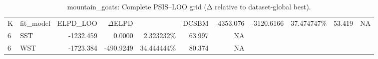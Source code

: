 \begin{table}[!h]
\centering
\caption{mountain_goats: Complete PSIS–LOO grid (Δ relative to dataset-global best).\\\label{tab:app-mountain_goats-A-psisloo-full}}
\centering
\begin{tabular}[t]{llrrrrr}
\toprule
K & fit_model & ELPD\_LOO & $\Delta$ELPD & %
 & DCSBM & -4353.076 & -3120.6166 & 37.474747\% & 53.419 & NA\\
6 & SST & -1232.459 & 0.0000 & 2.323232\% & 63.997 & NA\\
6 & WST & -1723.384 & -490.9249 & 34.444444\% & 80.374 & NA\\
\bottomrule
\end{tabular}
\end{table}
